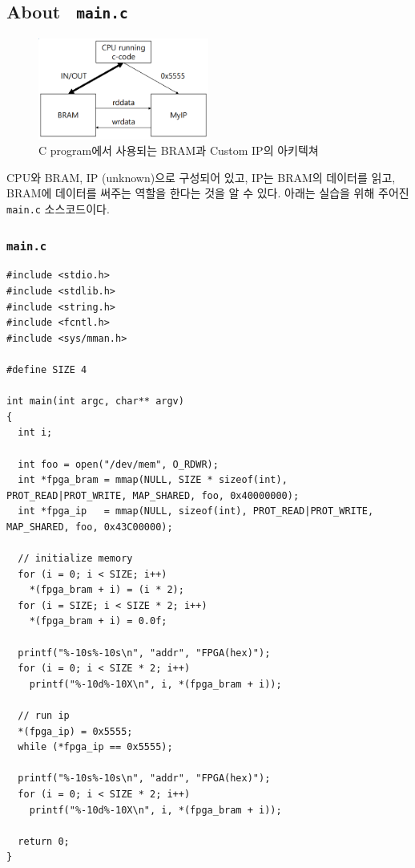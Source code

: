 \documentclass{article}
\begin{document}
\subsection{About \ \texttt{main.c}}
\begin{figure}[ht]
	\centering
	\includegraphics[width=0.5\textwidth]{fig/program_arch.PNG}
\caption{C program에서 사용되는 BRAM과 Custom IP의 아키텍쳐~\cite{lab}}
\label{fig2}
\end{figure}

CPU와 BRAM, IP (unknown)으로 구성되어 있고, IP는 BRAM의 데이터를 읽고, BRAM에 데이터를 써주는 역할을 한다는 것을 알 수 있다. 아래는 실습을 위해 주어진 \texttt{main.c} 소스코드이다.

\subsubsection*{\texttt{main.c}}
\begin{lstlisting}[style={c-style}]
#include <stdio.h>
#include <stdlib.h>
#include <string.h>
#include <fcntl.h>
#include <sys/mman.h>

#define SIZE 4

int main(int argc, char** argv)
{
  int i;

  int foo = open("/dev/mem", O_RDWR);
  int *fpga_bram = mmap(NULL, SIZE * sizeof(int), PROT_READ|PROT_WRITE, MAP_SHARED, foo, 0x40000000);
  int *fpga_ip   = mmap(NULL, sizeof(int), PROT_READ|PROT_WRITE, MAP_SHARED, foo, 0x43C00000);

  // initialize memory
  for (i = 0; i < SIZE; i++)
    *(fpga_bram + i) = (i * 2); 
  for (i = SIZE; i < SIZE * 2; i++)
    *(fpga_bram + i) = 0.0f; 

  printf("%-10s%-10s\n", "addr", "FPGA(hex)");
  for (i = 0; i < SIZE * 2; i++)
    printf("%-10d%-10X\n", i, *(fpga_bram + i));

  // run ip
  *(fpga_ip) = 0x5555;
  while (*fpga_ip == 0x5555);

  printf("%-10s%-10s\n", "addr", "FPGA(hex)");
  for (i = 0; i < SIZE * 2; i++)
    printf("%-10d%-10X\n", i, *(fpga_bram + i));

  return 0;
}
\end{lstlisting}
\end{document}
